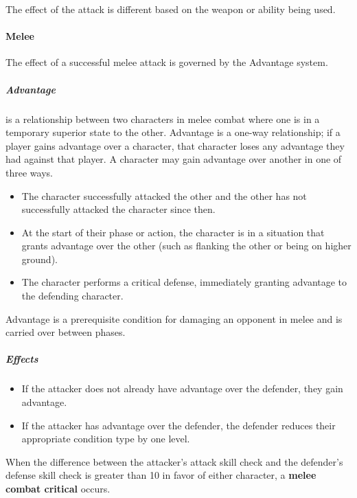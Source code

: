 \documentclass[11pt]{article}
\begin{document}
The effect of the attack is different based on the weapon or ability being used.

\paragraph{Melee}

The effect of a successful melee attack is governed by the Advantage system. 

\subparagraph{Advantage} is a relationship between two characters in melee combat where one is in a temporary superior state to the other.
Advantage is a one-way relationship; if a player gains advantage over a character, that character loses any advantage they had against that player.
A character may gain advantage over another in one of three ways.

\begin{itemize}
	\item The character successfully attacked the other and the other has not successfully attacked the character since then.
	\item At the start of their phase or action, the character is in a situation that grants advantage over the other (such as flanking the other or being on higher ground).
	\item The character performs a critical defense, immediately granting advantage to the defending character.
\end{itemize}

Advantage is a prerequisite condition for damaging an opponent in melee and is carried over between phases.

\subparagraph{Effects}
\begin{itemize}
	\item If the attacker does not already have advantage over the defender, they gain advantage.
	\item If the attacker has advantage over the defender, the defender reduces their appropriate condition type by one level.
\end{itemize}

When the difference between the attacker's attack skill check and the defender's defense skill check is greater than 10 in favor of either character, a \textbf{melee combat critical} occurs.
\end{document}
